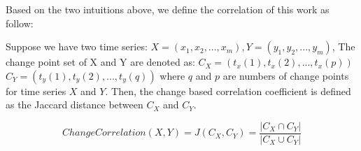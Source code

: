 Based on the two intuitions above, we define the correlation of this work as follow:
\begin{definition} 
\label{def:changeCorrelaion}
Suppose we have two time series: $X=(x_1,x_2,...,x_m),Y=(y_1,y_2,...,y_m)$, The change point set of X and Y are denoted as: 
$C_X=(t_x(1),t_x(2),...,t_x(p))$
$C_Y=(t_y(1),t_y(2),...,t_y(q))$
where $q$ and $p$ are numbers of change points for time series $X$ and $Y$.
Then, the change based correlation coefficient is defined as the Jaccard distance \cite{han2011data} between $C_X$ and $C_Y$.

\begin{equation}
ChangeCorrelation(X,Y) = J(C_X,C_Y)=\frac{|C_X \cap C_Y|}{|C_X \cup C_Y|}
\end{equation}

\end{definition}